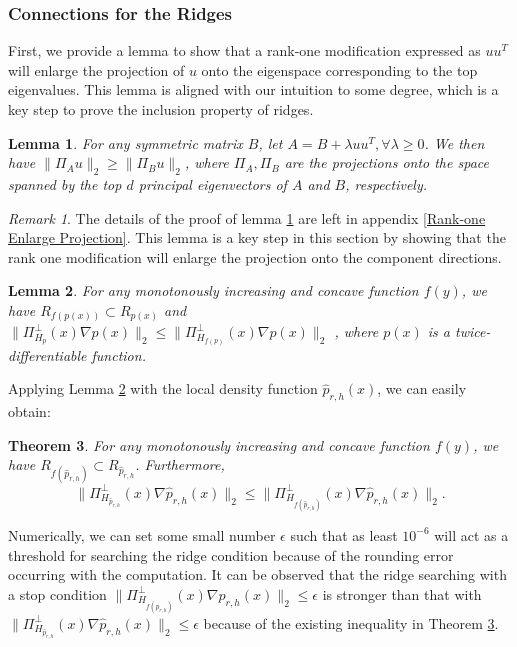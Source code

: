 \documentclass[aos,preprint]{imsart}
\newtheorem{theorem}{Theorem}[section]
\newtheorem{lemma}[theorem]{Lemma}
\theoremstyle{remark}
\newtheorem*{remark}{Remark}
\begin{document}
\subsubsection{Connections for the Ridges}
First, we provide a lemma to show that a rank-one modification expressed as $uu^T$ will enlarge the projection of $u$ onto the eigenspace corresponding to the top eigenvalues. This lemma is aligned with our intuition to some degree, which is a key step to prove the inclusion property of ridges.
\begin{lemma}{ For any symmetric matrix $B$, let $A = B +\lambda uu^T, \forall \lambda\geq 0$. We then have $\|\Pi_A u\|_2\geq \|\Pi_B u\|_2$, where $\Pi_A, \Pi_B$ are the projections onto the space spanned by the top $d$ principal eigenvectors of $A$ and $B$, respectively.} \label{projection_enlarge}
\end{lemma}
\begin{remark}
The details of the proof of lemma \ref{projection_enlarge} are left in appendix \ref{Rank-one Enlarge Projection}. This lemma is a key step in this section by showing that the rank one modification will enlarge the projection onto the component directions.
\end{remark}
\begin{lemma}{For any monotonously increasing and concave function $f(y)$, we have $R_{f(p(x))} \subset R_{p(x)}$ and $\|\Pi_{H_p}^\perp(x)\nabla p(x)\|_2 \leq \|\Pi_{H_{f(p)}}^{\perp}(x)\nabla p(x)\|_2$ }, where $p(x)$ is a twice-differentiable function. \label{rankonetheorem}
\end{lemma}
Applying Lemma \ref{rankonetheorem} with the local density function $\hat{p}_{r,h}(x)$, we can easily obtain:
\begin{theorem}\label{inclusion}
For any monotonously increasing and concave function $f(y)$, we have $R_{f(\hat{p}_{r,h})} \subset R_{\hat{p}_{r,h}}$. Furthermore, 
\[
\|\Pi_{H_{\hat{p}_{r,h}}}^\perp(x)\nabla \hat{p}_{r,h}(x)\|_2 \leq \|\Pi_{H_{f(\hat{p}_{r,h})}}^{\perp}(x)\nabla \hat{p}_{r,h}(x)\|_2.
\]
\end{theorem}

Numerically, we can set some small number $\epsilon$ such that as least $10^{-6}$ will act as a threshold for searching the ridge condition because of the rounding error occurring with the computation. It can be observed that the ridge searching with a stop condition $\|\Pi_{H_{f(p_{r,h})}}^{\perp}(x)\nabla \hat{p}_{r,h}(x)\|_2\leq \epsilon$ is stronger than that with $\|\Pi_{H_{\hat{p}_{r,h}}}^\perp(x)\nabla \hat{p}_{r,h}(x)\|_2\leq \epsilon$ because of the existing inequality in Theorem \ref{inclusion}. 
\end{document}
